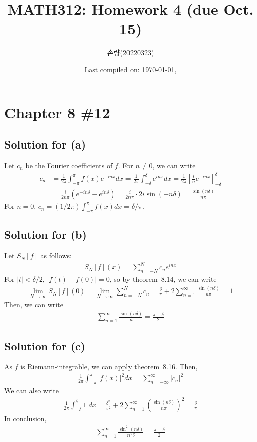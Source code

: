 \documentclass{scrartcl}
\title{MATH312: Homework 4 (due Oct. 15)}
\author{손량(20220323)}
\date{Last compiled on: \today, \currenttime}
\begin{document}
\maketitle

\section{Chapter 8 \#12}
\subsection{Solution for (a)}
Let \(c_n\) be the Fourier coefficients of \(f\). For \(n \not = 0\), we can
write
\begin{align*}
  c_n
  &= \frac{1}{2\pi} \int^\pi_{-\pi} f(x) e^{-inx} dx
  = \frac{1}{2\pi} \int^\delta_{-\delta} e^{inx} dx
  = \frac{1}{2\pi} \left[ \frac{i}{n} e^{-inx} \right]^\delta_{-\delta} \\
  &= \frac{i}{2n\pi} (e^{-in\delta} - e^{in\delta})
  = \frac{i}{2n\pi} \cdot 2i\sin (-n\delta)
  = \frac{\sin (n\delta)}{n\pi}
\end{align*}
For \(n = 0\), \(c_n = (1 / 2\pi) \int^\pi_{-\pi} f(x) dx = \delta / \pi\).

\subsection{Solution for (b)}
Let \(S_N[f]\) as follows:
\begin{align*}
  S_N[f](x) = \sum^N_{n = -N} c_n e^{inx}
\end{align*}
For \(|t| < \delta / 2\), \(|f(t) - f(0)| = 0\), so by theorem~8.14, we can
write
\begin{align*}
  \lim_{N \to \infty} S_N[f](0)
  = \lim_{N \to \infty} \sum^N_{n = -N} c_n
  = \frac{\delta}{\pi} + 2\sum^\infty_{n = 1} \frac{\sin (n\delta)}{n\pi}
  = 1
\end{align*}
Then, we can write
\begin{align*}
  \sum^\infty_{n = 1} \frac{\sin (n\delta)}{n}
  = \frac{\pi - \delta}{2}
\end{align*}

\subsection{Solution for (c)}
As \(f\) is Riemann-integrable, we can apply theorem~8.16. Then,
\begin{align*}
  \frac{1}{2\pi} \int^\pi_{-\pi} |f(x)|^2 dx
  = \sum^{\infty}_{n = -\infty} |c_n|^2
\end{align*}
We can also write
\begin{align*}
  \frac{1}{2\pi} \int^\delta_{-\delta} 1\; dx
  = \frac{\delta^2}{\pi^2} + 2\sum^\infty_{n = 1}
    \left( \frac{\sin (n\delta)}{n\pi} \right)^2
  = \frac{\delta}{\pi}
\end{align*}
In conclusion,
\begin{align*}
  \sum^\infty_{n = 1} \frac{\sin^2 (n\delta)}{n^2 \delta}
  = \frac{\pi - \delta}{2}
\end{align*}
\end{document}
